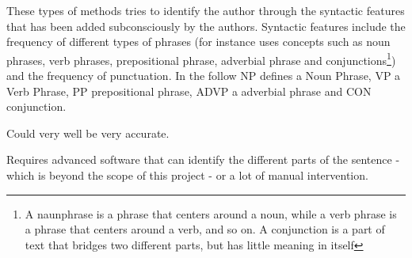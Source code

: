 {\label{syntactic}
These types of methods tries to identify the author through the syntactic features that has been added subconsciously by the authors. Syntactic features include the frequency of different types of phrases (for instance \cite{style} uses concepts such as noun phrases, verb phrases, prepositional phrase, adverbial phrase and conjunctions\footnote{A naunphrase is a phrase that centers around a noun, while a verb phrase is a phrase that centers around a verb, and so on. A conjunction is a part of text that bridges two different parts, but has little meaning in itself}) and the frequency of punctuation.
} 
{
In the follow NP defines a Noun Phrase, VP a Verb Phrase, PP prepositional phrase, ADVP a adverbial phrase and CON conjunction.\\
}
{
\item Could very well be very accurate.
}{
\item Requires advanced software that can identify the different parts of the sentence - which is beyond the scope of this project - or a lot of manual intervention.
}

